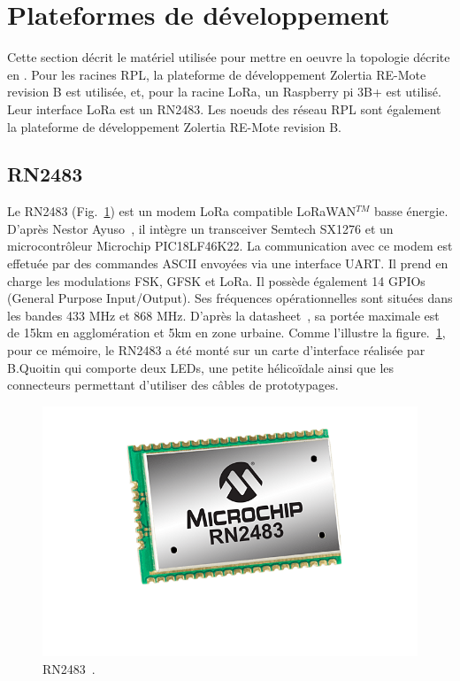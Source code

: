 \section{Plateformes de développement}%
\renewcommand{\rightmark}{Plateformes de développement}
    Cette section décrit le matériel utilisée pour mettre en oeuvre la topologie décrite en . Pour les racines RPL, la plateforme de développement Zolertia RE-Mote revision B est utilisée, et,  pour la racine LoRa, un Raspberry pi 3B+ est utilisé. Leur interface LoRa est un RN2483. Les noeuds des réseau RPL sont également la plateforme de développement Zolertia RE-Mote revision B.

\subsection*{RN2483}
    Le RN2483 (Fig.~\ref{fig:state-rn2483}) est un modem LoRa compatible LoRaWAN$^{TM}$ basse énergie. D'après Nestor Ayuso~\cite{ayuso_2015}, il intègre un transceiver Semtech SX1276 et un
    microcontrôleur Microchip PIC18LF46K22.
    La communication avec ce modem est effetuée par des commandes ASCII envoyées via une interface UART. Il prend en charge les modulations FSK, GFSK et LoRa. Il possède également 14 GPIOs (General Purpose Input/Output).
    Ses fréquences opérationnelles sont situées dans les bandes 433 MHz et 868 MHz.
    D'après la datasheet~\cite{rn2483:datasheet}, 
    sa portée maximale est de 15km en agglomération et 5km en zone urbaine. Comme l'illustre la figure.~\ref{fig:state-rn2483}, pour ce mémoire, le RN2483 a été monté sur un carte d'interface réalisée par B.Quoitin qui comporte deux LEDs, une petite hélicoïdale ainsi que les connecteurs permettant d'utiliser des câbles de prototypages.

    \begin{figure}[H]%
        \centering
        \includegraphics[scale=0.3]{res/pictures/rn2483.png}
        \caption{RN2483~\cite{rn2483:shop}.}
        \label{fig:state-rn2483}
    \end{figure}

